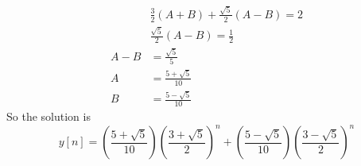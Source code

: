 \documentclass[10pt,a4paper, margin=1in]{article}
\begin{document}
\begin{enumerate}
\begin{enumerate}
\begin{equation}
	\begin{split}		
		& \frac{3}{2}(A+B)+\frac{\sqrt{5}}{2}(A-B)  =2 \\
		& \frac{\sqrt{5}}{2}(A-B) = \frac{1}{2} \\
		 A - B  & = \frac{\sqrt{5}}{5} \\
		A  & = \frac{5+\sqrt{5}}{10} \\
		B &  = \frac{5-\sqrt{5}}{10}  
	\end{split}	
    \end{equation}
    So the solution is
    \begin{equation}
	y[n]  = \left(\frac{5+\sqrt{5}}{10}\right)\left(\frac{3+\sqrt{5}}{2}\right)^n + \left(\frac{5-\sqrt{5}}{10}\right)\left(\frac{3-\sqrt{5}}{2}\right)^n
    \end{equation}

    \end{enumerate}


\end{enumerate}
\end{document}
